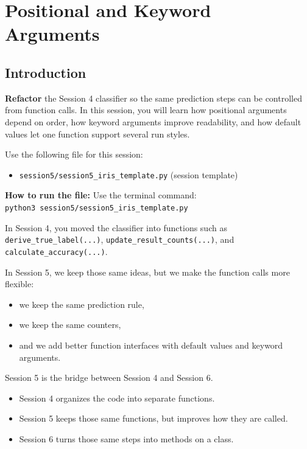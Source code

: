 \chapter{Positional and Keyword Arguments}

\section{Introduction}

\begin{tcolorbox}[title=Goal]
\textbf{Refactor} the Session 4 classifier so the same prediction steps can be controlled from function calls. In this session, you will learn how positional arguments depend on order, how keyword arguments improve readability, and how default values let one function support several run styles.
\end{tcolorbox}

\begin{tcolorbox}[title=You will work in]
Use the following file for this session:
\begin{itemize}
    \item \texttt{session5/session5\_iris\_template.py} (session template)
\end{itemize}
\textbf{How to run the file:} Use the terminal command: \\
\texttt{python3 session5/session5\_iris\_template.py}
\end{tcolorbox}

In Session 4, you moved the classifier into functions such as \texttt{derive\_true\_label(...)}, \texttt{update\_result\_counts(...)}, and \texttt{calculate\_accuracy(...)}.

In Session 5, we keep those same ideas, but we make the function calls more flexible:
\begin{itemize}
    \item we keep the same prediction rule,
    \item we keep the same counters,
    \item and we add better function interfaces with default values and keyword arguments.
\end{itemize}

\begin{tcolorbox}[title=Why this matters]
Session 5 is the bridge between Session 4 and Session 6.
\begin{itemize}
    \item Session 4 organizes the code into separate functions.
    \item Session 5 keeps those same functions, but improves how they are called.
    \item Session 6 turns those same steps into methods on a class.
\end{itemize}
\end{tcolorbox}

